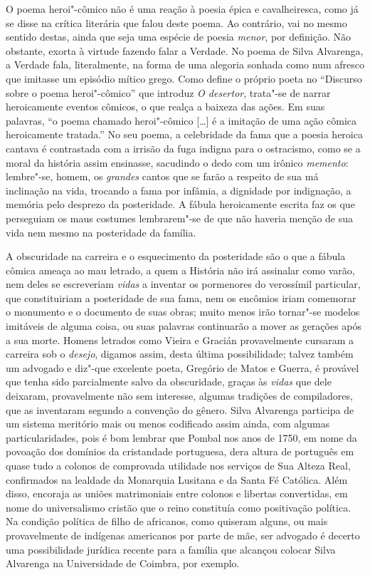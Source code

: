 O poema heroi"-cômico não é uma reação à poesia épica e cavalheiresca, como já se
disse na crítica literária que falou deste poema. Ao contrário, vai no mesmo
sentido destas, ainda que seja uma espécie de poesia \textit{menor}, por
definição.  Não obstante, exorta à virtude fazendo falar a Verdade. No poema de
Silva Alvarenga, a Verdade fala, literalmente, na forma de uma alegoria sonhada
como num afresco que imitasse um episódio mítico grego. Como define o próprio
poeta no ``Discurso sobre o poema heroi"-cômico'' que introduz \textit{O
desertor}, trata"-se de narrar heroicamente eventos cômicos, o que realça a
baixeza das ações. Em suas palavras, ``o poema chamado heroi"-cômico [\ldots] é a
imitação de uma ação cômica heroicamente tratada.'' No seu poema, a celebridade
da fama que a poesia heroica cantava é contrastada com a irrisão da fuga indigna
para o ostracismo, como se a moral da história assim ensinasse, sacudindo o dedo
com um irônico \textit{memento}: lembre"-se, homem, os \textit{grandes} cantos
que se farão a respeito de sua má inclinação na vida, trocando a fama por
infâmia, a dignidade por indignação, a memória pelo desprezo da posteridade. A
fábula  heroicamente escrita faz os que perseguiam os maus costumes lembrarem"-se
de que não haveria menção de sua vida nem mesmo na posteridade da família. 

A obscuridade na carreira e o esquecimento da posteridade são o que a fábula
cômica ameaça ao mau letrado, a quem a História não irá assinalar como varão,
nem deles se escreveriam \textit{vidas} a inventar os pormenores do verossímil
particular, que constituiriam a posteridade de sua fama, nem os encômios iriam
comemorar o monumento e o documento de suas obras; muito menos irão tornar"-se
modelos imitáveis de alguma coisa, ou suas palavras continuarão a mover as
gerações após a sua morte. Homens letrados como Vieira e Gracián provavelmente
cursaram a carreira sob o \textit{desejo}, digamos assim, desta última
possibilidade; talvez também um advogado e diz"-que excelente poeta, Gregório de
Matos e Guerra, é provável que tenha sido parcialmente salvo da obscuridade,
graças às \textit{vidas} que dele deixaram, provavelmente não sem interesse,
algumas tradições de compiladores, que as inventaram segundo a convenção do
gênero.  Silva Alvarenga participa de um sistema meritório mais ou menos
codificado assim ainda, com algumas particularidades, pois é bom lembrar que
Pombal nos anos de 1750, em nome da povoação dos domínios da cristandade		\EP
portuguesa, dera altura de português em quase tudo a colonos de comprovada
utilidade nos serviços de Sua Alteza Real, confirmados na lealdade da Monarquia
Lusitana e da Santa Fé Católica. Além disso, encoraja as uniões matrimoniais
entre colonos e libertas convertidas, em nome do universalismo cristão que o
reino constituía como positivação política.  Na condição política de filho de
africanos, como quiseram alguns, ou mais provavelmente de indígenas americanos
por parte de mãe, ser advogado é decerto uma possibilidade jurídica recente para
a família que alcançou colocar Silva Alvarenga na Universidade de Coimbra, por
exemplo.

